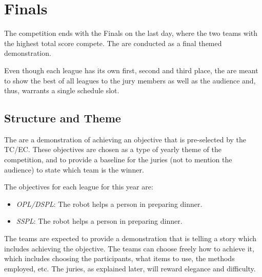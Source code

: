 \chapter{Finals}

The competition ends with the Finals on the last day, where the two teams with the highest total score compete.
The  are conducted as a final themed demonstration.


Even though each league has its own first, second and third place, the  are meant to show the best of all leagues to the jury members as well as the audience and, thus, warrants a single schedule slot.

\section{Structure and Theme}

The  are a demonstration of achieving an objective that is pre-selected by the TC/EC. These objectives are chosen as a type of yearly theme of the competition, and to provide a baseline for the juries (not to mention the audience) to state which team is the winner.

The objectives for each league for this year are:

\begin{itemize}
    \item \emph{OPL/DSPL}: The robot helps a person in preparing dinner.
    \item \emph{SSPL}: The robot helps a person in preparing dinner.
\end{itemize}


The teams are expected to provide a demonstration that is telling a story which includes achieving the objective. The teams can choose freely how to achieve it, which includes choosing the participants, what items to use, the methods employed, etc. The juries, as explained later, will reward elegance and difficulty.

